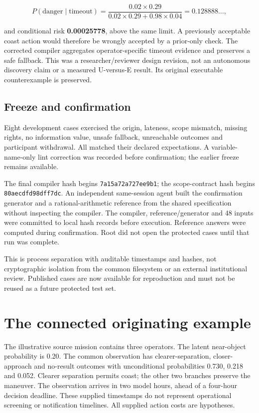 \documentclass[11pt,letterpaper]{article}
\begin{document}
\[
P(\text{danger}\mid\text{timeout})=
\frac{0.02\times0.29}{0.02\times0.29+0.98\times0.04}=0.128888\ldots,
\]

and conditional risk \textbf{0.00025778}, above the same limit. A
previously acceptable coast action would therefore be wrongly accepted
by a prior-only check. The corrected compiler aggregates
operator-specific timeout evidence and preserves a safe fallback. This
was a researcher/reviewer design revision, not an autonomous discovery
claim or a measured U-versus-E result. Its original executable
counterexample is preserved.

\hypertarget{freeze-and-confirmation}{%
\subsection{Freeze and confirmation}\label{freeze-and-confirmation}}

Eight development cases exercised the origin, lateness, scope mismatch,
missing rights, no information value, unsafe fallback, unreachable
outcomes and participant withdrawal. All matched their declared
expectations. A variable-name-only lint correction was recorded before
confirmation; the earlier freeze remains available.

The final compiler hash begins \texttt{7a15a72a727ee9b1}; the
scope-contract hash begins \texttt{80aecdfd98dff7dc}. An independent
same-session agent built the confirmation generator and a
rational-arithmetic reference from the shared specification without
inspecting the compiler. The compiler, reference/generator and 48 inputs
were committed to local hash records before execution. Reference answers
were computed during confirmation. Root did not open the protected cases
until that run was complete.

This is process separation with auditable timestamps and hashes, not
cryptographic isolation from the common filesystem or an external
institutional review. Published cases are now available for reproduction
and must not be reused as a future protected test set.

\hypertarget{the-connected-originating-example}{%
\section{The connected originating
example}\label{the-connected-originating-example}}

The illustrative source mission contains three operators. The latent
near-object probability is 0.20. The common observation has
clearer-separation, closer-approach and no-result outcomes with
unconditional probabilities 0.730, 0.218 and 0.052. Clearer separation
permits coast; the other two branches preserve the maneuver. The
observation arrives in two model hours, ahead of a four-hour decision
deadline. These supplied timestamps do not represent operational
screening or notification timelines. All supplied action costs are
hypotheses.
\end{document}
